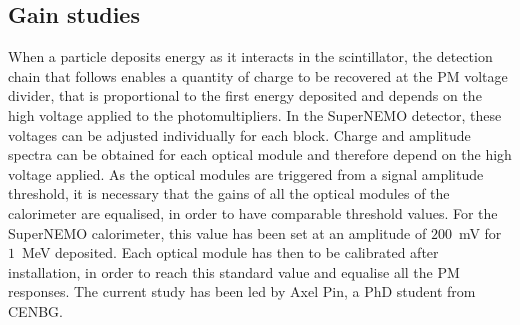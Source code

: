 \subsection{Gain studies}


When a particle deposits energy as it interacts in the scintillator, the detection chain that follows enables a quantity of charge to be recovered at the PM voltage divider, that is proportional to the first energy deposited and depends on the high voltage applied to the photomultipliers.
In the SuperNEMO detector, these voltages can be adjusted individually for each block.
Charge and amplitude spectra can be obtained for each optical module and therefore depend on the high voltage applied.
As the optical modules are triggered from a signal amplitude threshold, it is necessary that the gains of all the optical modules of the calorimeter are equalised, in order to have comparable threshold values.
For the SuperNEMO calorimeter, this value has been set at an amplitude of $200$~mV for $1$~MeV deposited.
Each optical module has then to be calibrated after installation, in order to reach this standard value and equalise all the PM responses.
The current study has been led by Axel Pin, a PhD student from CENBG.

